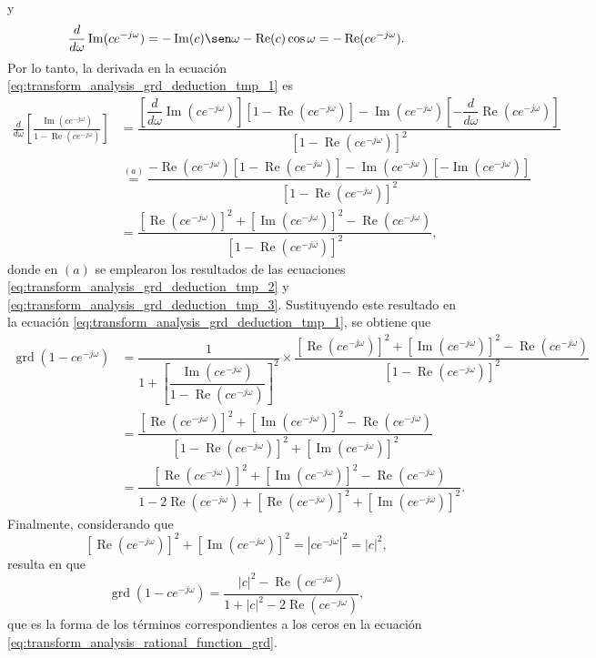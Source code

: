 \documentclass[a4paper]{report}
\renewcommand{\Re}{\operatorname{Re}}
\renewcommand{\Im}{\operatorname{Im}}
\DeclareMathOperator{\grd}{grd}
\begin{document}
y
\begin{equation}\label{eq:transform_analysis_grd_deduction_tmp_3}
 \frac{d}{d\omega}\Im(ce^{-j\omega})=-\Im(c)\sen\omega-\Re(c)\cos\omega=-\Re(ce^{-j\omega}). 
\end{equation}
Por lo tanto, la derivada en la ecuación \ref{eq:transform_analysis_grd_deduction_tmp_1} es
\begin{align*}
 \frac{d}{d\omega}\left[\frac{\Im(ce^{-j\omega})}{1-\Re(ce^{-j\omega})}\right]&=
  \dfrac{\left[\dfrac{d}{d\omega}\Im(ce^{-j\omega})\right][1-\Re(ce^{-j\omega})]-\Im(ce^{-j\omega})\left[-\dfrac{d}{d\omega}\Re(ce^{-j\omega})\right]}{\left[1-\Re(ce^{-j\omega})\right]^2}\\
   &\overset{(a)}{=}
  \dfrac{-\Re(ce^{-j\omega})[1-\Re(ce^{-j\omega})]-\Im(ce^{-j\omega})\left[-\Im(ce^{-j\omega})\right]}{\left[1-\Re(ce^{-j\omega})\right]^2}\\
  &=
  \dfrac{[\Re(ce^{-j\omega})]^2+[\Im(ce^{-j\omega})]^2-\Re(ce^{-j\omega})}{\left[1-\Re(ce^{-j\omega})\right]^2},
\end{align*}
donde en \((a)\) se emplearon los resultados de las ecuaciones \ref{eq:transform_analysis_grd_deduction_tmp_2} y \ref{eq:transform_analysis_grd_deduction_tmp_3}. Sustituyendo este resultado en la ecuación \ref{eq:transform_analysis_grd_deduction_tmp_1}, se obtiene que 
\begin{align*}
 \grd(1-ce^{-j\omega})&=
   \dfrac{1}{1+\left[\dfrac{\Im(ce^{-j\omega})}{1-\Re(ce^{-j\omega})}\right]^2}\times
    \dfrac{[\Re(ce^{-j\omega})]^2+[\Im(ce^{-j\omega})]^2-\Re(ce^{-j\omega})}{\left[1-\Re(ce^{-j\omega})\right]^2}\\
    &=
   \dfrac{[\Re(ce^{-j\omega})]^2+[\Im(ce^{-j\omega})]^2-\Re(ce^{-j\omega})}{[1-\Re(ce^{-j\omega})]^2+\left[\Im(ce^{-j\omega})\right]^2}\\
    &=
   \dfrac{[\Re(ce^{-j\omega})]^2+[\Im(ce^{-j\omega})]^2-\Re(ce^{-j\omega})}{1-2\Re(ce^{-j\omega})+[\Re(ce^{-j\omega})]^2+\left[\Im(ce^{-j\omega})\right]^2}.
\end{align*}
Finalmente, considerando que 
\[
 [\Re(ce^{-j\omega})]^2+[\Im(ce^{-j\omega})]^2=|ce^{-j\omega}|^2=|c|^2,
\]
resulta en que 
\begin{equation}\label{eq:transform_analysis_single_factor_grd_alt}
 \grd(1-ce^{-j\omega})=\dfrac{|c|^2-\Re(ce^{-j\omega})}{1+|c|^2-2\Re(ce^{-j\omega})}, 
\end{equation}
que es la forma de los términos correspondientes a los ceros en la ecuación \ref{eq:transform_analysis_rational_function_grd}.
\end{document}
